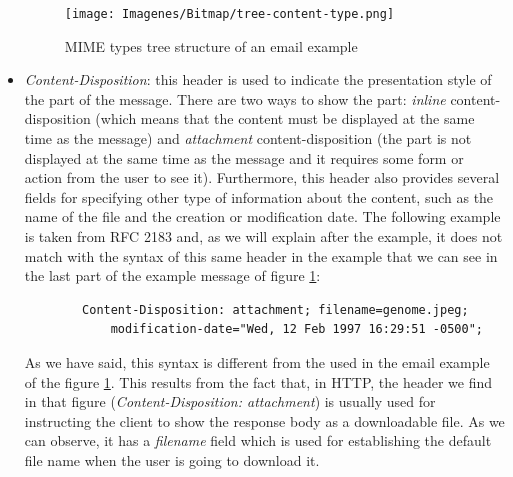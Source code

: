 \begin{itemize}
	\begin{figure}[t]
		\centering%
		\texttt{[image: Imagenes/Bitmap/tree-content-type.png]}%
		\caption{MIME types tree structure of an email example}%
		\label{fig:content-type}
	\end{figure}
	\item\textit{Content-Disposition}: this header is used to indicate the presentation style of the part of the message. There are two ways to show the part: \textit{inline} content-disposition (which means that the content must be displayed at the same time as the message) and \textit{attachment} content-disposition (the part is not displayed at the same time as the message and it requires some form or action from the user to see it). Furthermore, this header also provides several fields for specifying other type of information about the content, such as the name of the file and the creation or modification date. The following example is taken from RFC 2183 \citep{rfc2183} and, as we will explain after the example, it does not match with the syntax of this same header in the example that we can see in the last part of the example message of figure \ref{fig:content-type}:
	\begin{lstlisting}
		Content-Disposition: attachment; filename=genome.jpeg;
			modification-date="Wed, 12 Feb 1997 16:29:51 -0500";
	\end{lstlisting}
	As we have said, this syntax is different from the used in the email example of the figure \ref{fig:content-type}. This results from the fact that, in HTTP, the header we find in that figure (\textit{Content-Disposition: attachment}) is usually used for instructing the client to show the response body as a downloadable file. As we can observe, it has a \textit{filename} field which is used for establishing the default file name when the user is going to download it.
	

\end{itemize}
